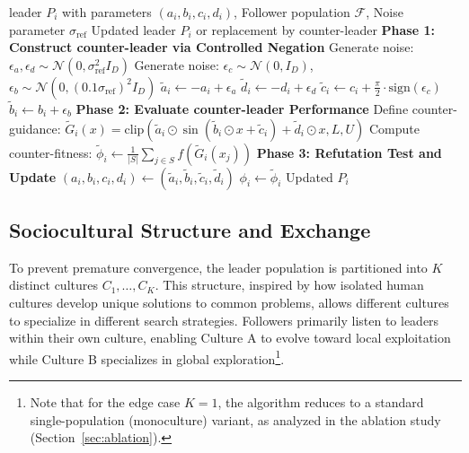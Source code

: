 \documentclass[11pt]{article}
\begin{document}
\begin{algorithm}[h]
\caption{Systematic Refutation Process}
\label{alg:refutation}
\begin{algorithmic}[1]
\Require leader $P_i$ with parameters $(a_i, b_i, c_i, d_i)$, Follower population $\mathcal{F}$, Noise parameter $\sigma_{\text{ref}}$
\Ensure Updated leader $P_i$ or replacement by counter-leader
\State \textbf{Phase 1: Construct counter-leader via Controlled Negation}
\State Generate noise: $\epsilon_a, \epsilon_d \sim \mathcal{N}(0, \sigma_{\text{ref}}^2 I_D)$
\State Generate noise: $\epsilon_c \sim \mathcal{N}(0, I_D)$, $\epsilon_b \sim \mathcal{N}(0, (0.1\sigma_{\text{ref}})^2 I_D)$
\State $\tilde{a}_i \leftarrow -a_i + \epsilon_a$ 
\State $\tilde{d}_i \leftarrow -d_i + \epsilon_d$ 
\State $\tilde{c}_i \leftarrow c_i + \frac{\pi}{2} \cdot \text{sign}(\epsilon_c)$ 
\State $\tilde{b}_i \leftarrow b_i + \epsilon_b$ 
\State \textbf{Phase 2: Evaluate counter-leader Performance}
\State Define counter-guidance: $\tilde{G}_i(x) = \text{clip}(\tilde{a}_i \odot \sin(\tilde{b}_i \odot x + \tilde{c}_i) + \tilde{d}_i \odot x, L, U)$
\State Compute counter-fitness: $\tilde{\phi}_i \leftarrow \frac{1}{|S|} \sum_{j \in S} f(\tilde{G}_i(x_j))$
\State \textbf{Phase 3: Refutation Test and Update}
 
    \State $(a_i, b_i, c_i, d_i) \leftarrow (\tilde{a}_i, \tilde{b}_i, \tilde{c}_i, \tilde{d}_i)$ 
    \State $\phi_i \leftarrow \tilde{\phi}_i$ 
\EndIf
\State \Return Updated $P_i$
\end{algorithmic}
\end{algorithm}

\subsection{Sociocultural Structure and Exchange}


To prevent premature convergence, the leader population is partitioned into $K$ distinct cultures $C_1, \ldots, C_K$. This structure, inspired by how isolated human cultures develop unique solutions to common problems, allows different cultures to specialize in different search strategies. Followers primarily listen to leaders within their own culture, enabling Culture A to evolve toward local exploitation while Culture B specializes in global exploration\footnote{Note that for the edge case $K=1$, the algorithm reduces to a standard single-population (monoculture) variant, as analyzed in the ablation study (Section~\ref{sec:ablation}).}.
\end{document}
